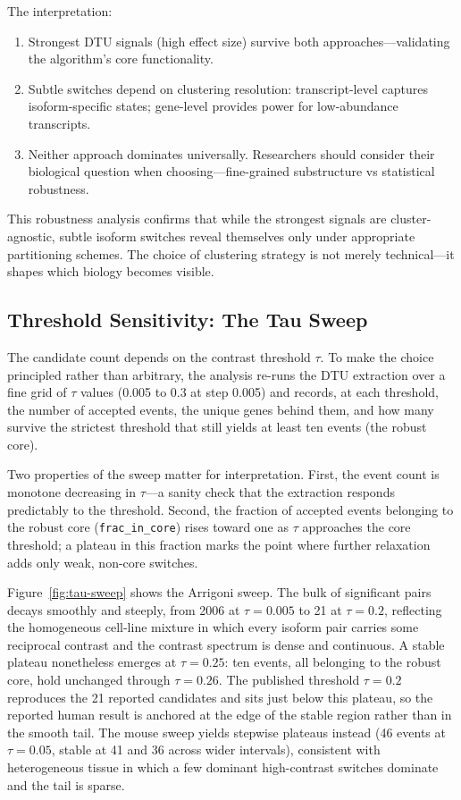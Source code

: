 The interpretation:
\begin{enumerate}
    \item Strongest DTU signals (high effect size) survive both approaches---validating the algorithm's core functionality.
    
    \item Subtle switches depend on clustering resolution: transcript-level captures isoform-specific states; gene-level provides power for low-abundance transcripts.
    
    \item Neither approach dominates universally. Researchers should consider their biological question when choosing---fine-grained substructure vs statistical robustness.
\end{enumerate}

This robustness analysis confirms that while the strongest signals are cluster-agnostic, subtle isoform switches reveal themselves only under appropriate partitioning schemes. The choice of clustering strategy is not merely technical---it shapes which biology becomes visible.

\subsection*{Threshold Sensitivity: The Tau Sweep}\label{sec:tau-sweep}

The candidate count depends on the contrast threshold $\tau$. To make the choice principled rather than arbitrary, the analysis re-runs the DTU extraction over a fine grid of $\tau$ values (0.005 to 0.3 at step 0.005) and records, at each threshold, the number of accepted events, the unique genes behind them, and how many survive the strictest threshold that still yields at least ten events (the robust core).

Two properties of the sweep matter for interpretation. First, the event count is monotone decreasing in $\tau$---a sanity check that the extraction responds predictably to the threshold. Second, the fraction of accepted events belonging to the robust core (\texttt{frac\_in\_core}) rises toward one as $\tau$ approaches the core threshold; a plateau in this fraction marks the point where further relaxation adds only weak, non-core switches.

Figure~\ref{fig:tau-sweep} shows the Arrigoni sweep. The bulk of significant pairs decays smoothly and steeply, from 2006 at $\tau = 0.005$ to 21 at $\tau = 0.2$, reflecting the homogeneous cell-line mixture in which every isoform pair carries some reciprocal contrast and the contrast spectrum is dense and continuous. A stable plateau nonetheless emerges at $\tau = 0.25$: ten events, all belonging to the robust core, hold unchanged through $\tau = 0.26$. The published threshold $\tau = 0.2$ reproduces the 21 reported candidates and sits just below this plateau, so the reported human result is anchored at the edge of the stable region rather than in the smooth tail. The mouse sweep yields stepwise plateaus instead (46 events at $\tau = 0.05$, stable at 41 and 36 across wider intervals), consistent with heterogeneous tissue in which a few dominant high-contrast switches dominate and the tail is sparse.

